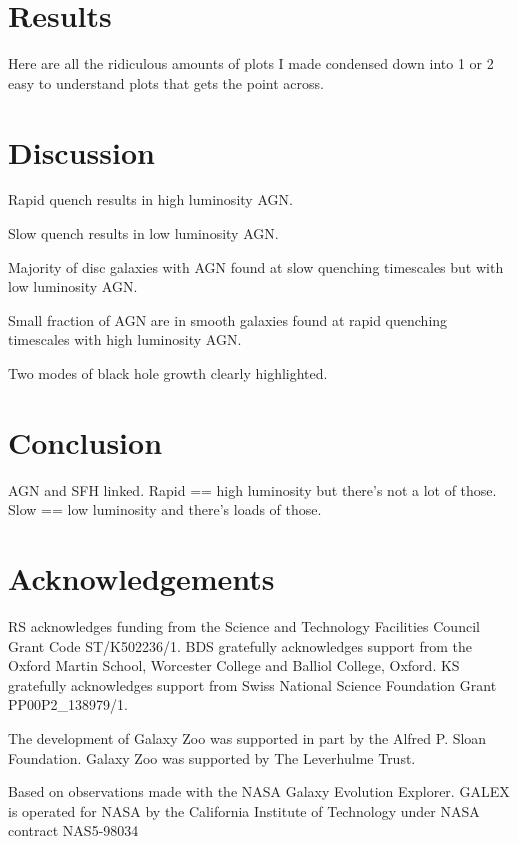 \documentclass[useAMS,usenatbib]{mn2e}
\begin{document}
\section{Results}

Here are all the ridiculous amounts of plots I made condensed down into 1 or 2 easy to understand plots that gets the point across. 

\section{Discussion}

Rapid quench results in high luminosity AGN. 

Slow quench results in low luminosity AGN. 

Majority of disc galaxies with AGN found at slow quenching timescales but with low luminosity AGN. 

Small fraction of AGN are in smooth galaxies found at rapid quenching timescales with high luminosity AGN. 

Two modes of black hole growth clearly highlighted. 

\section{Conclusion}

AGN and SFH linked. Rapid == high luminosity but there's not a lot of those. Slow == low luminosity and there's loads of those. 

\section*{Acknowledgements}

RS acknowledges funding from the Science and Technology Facilities Council Grant Code ST/K502236/1. BDS gratefully acknowledges support from the Oxford Martin School, Worcester College and Balliol College, Oxford. KS gratefully acknowledges support from Swiss National Science Foundation Grant PP00P2\_138979/1.

The development of Galaxy Zoo was supported in part by the Alfred P. Sloan Foundation. Galaxy Zoo was supported by The Leverhulme Trust. 

Based on observations made with the NASA Galaxy Evolution Explorer.  GALEX is operated for NASA by the California Institute of Technology under NASA contract NAS5-98034
\end{document}
